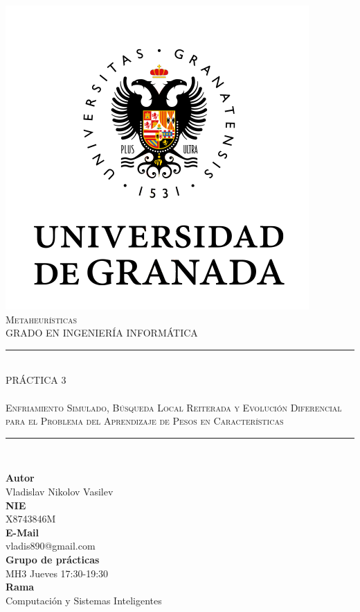 \documentclass[11pt,a4paper]{article}
\newcommand{\asignatura}{Metaheurísticas}
\newcommand{\autor}{Vladislav Nikolov Vasilev}
\begin{document}

\begin{titlepage}

\begin{minipage}{\textwidth}

\centering

\includegraphics[scale=0.3]{img/ugr.png}\\

\textsc{\Large \asignatura{}\\[0.2cm]}
\textsc{GRADO EN INGENIERÍA INFORMÁTICA}\\[0.3cm]

\noindent\rule[-1ex]{\textwidth}{1pt}\\[1.5ex]
\textsc{{\Huge PRÁCTICA 3\\[1pt]}}
\textsc{{\Large \\Enfriamiento Simulado, Búsqueda Local Reiterada y Evolución Diferencial para el Problema del Aprendizaje de Pesos en Características}}
\noindent\rule[-1ex]{\textwidth}{2pt}\\[1ex]

\end{minipage}

\vspace{0.18cm}

\begin{minipage}{\textwidth}

\centering

\textbf{Autor}\\ {\autor{}}\\[1ex]
\textbf{NIE}\\ {X8743846M}\\[1ex]
\textbf{E-Mail}\\ {vladis890@gmail.com}\\[1ex]
\textbf{Grupo de prácticas}\\ {MH3 Jueves 17:30-19:30}\\[1ex]
\textbf{Rama}\\ {Computación y Sistemas Inteligentes}\\[1ex]
\vspace{0.2cm}


\end{minipage}
\end{titlepage}
\end{document}
